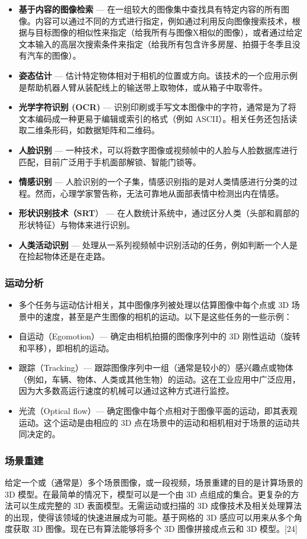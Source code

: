 \begin{itemize}
\item \textbf{基于内容的图像检索} — 在一组较大的图像集中查找具有特定内容的所有图像。内容可以通过不同的方式进行指定，例如通过利用反向图像搜索技术，根据与目标图像的相似性来指定（给我所有与图像X相似的图像），或者通过给定文本输入的高层次搜索条件来指定（给我所有包含许多房屋、拍摄于冬季且没有汽车的图像）。
\item \textbf{姿态估计} — 估计特定物体相对于相机的位置或方向。该技术的一个应用示例是帮助机器人臂从装配线上的输送带上取物体，或从箱子中取零件。
\item \textbf{光学字符识别 (OCR)} — 识别印刷或手写文本图像中的字符，通常是为了将文本编码成一种更易于编辑或索引的格式（例如 ASCII）。相关任务还包括读取二维条形码，如数据矩阵和二维码。
\item \textbf{人脸识别} — 一种技术，可以将数字图像或视频帧中的人脸与人脸数据库进行匹配，目前广泛用于手机面部解锁、智能门锁等。
\item \textbf{情感识别} — 人脸识别的一个子集，情感识别指的是对人类情感进行分类的过程。然而，心理学家警告称，无法可靠地从面部表情中检测出内在情感。
\item \textbf{形状识别技术（SRT}） — 在人数统计系统中，通过区分人类（头部和肩部的形状特征）与物体来进行识别。
\item \textbf{人类活动识别} — 处理从一系列视频帧中识别活动的任务，例如判断一个人是在捡起物体还是在走路。
\end{itemize}
\subsubsection{运动分析}  
\begin{itemize}
\item 多个任务与运动估计相关，其中图像序列被处理以估算图像中每个点或 3D 场景中的速度，甚至是产生图像的相机的运动。以下是这些任务的一些示例：
\item 自运动（Egomotion）— 确定由相机拍摄的图像序列中的 3D 刚性运动（旋转和平移），即相机的运动。
\item 跟踪（Tracking）— 跟踪图像序列中一组（通常是较小的）感兴趣点或物体（例如，车辆、物体、人类或其他生物）的运动。这在工业应用中广泛应用，因为大多数高运行速度的机械可以通过这种方式进行监控。
\item 光流（Optical flow）— 确定图像中每个点相对于图像平面的运动，即其表观运动。这个运动是由相应的 3D 点在场景中的运动和相机相对于场景的运动共同决定的。
\end{itemize}
\subsubsection{场景重建}  
给定一个或（通常是）多个场景图像，或一段视频，场景重建的目的是计算场景的 3D 模型。在最简单的情况下，模型可以是一个由 3D 点组成的集合。更复杂的方法可以生成完整的 3D 表面模型。无需运动或扫描的 3D 成像技术及相关处理算法的出现，使得该领域的快速进展成为可能。基于网格的 3D 感应可以用来从多个角度获取 3D 图像。现在已有算法能够将多个 3D 图像拼接成点云和 3D 模型。[24]
